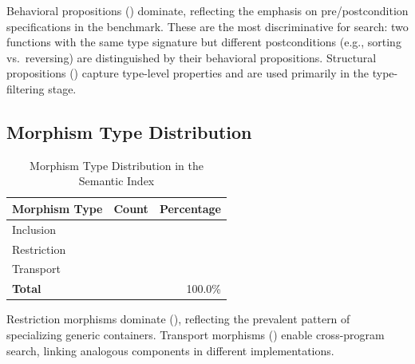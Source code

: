 \documentclass[11pt]{article}
\begin{document}
Behavioral propositions (\suppPropBehavioralPct) dominate, reflecting
the emphasis on pre/postcondition specifications in the benchmark.
These are the most discriminative for search: two functions with the
same type signature but different postconditions (e.g., sorting vs.\
reversing) are distinguished by their behavioral propositions.
Structural propositions (\suppPropStructuralPct) capture type-level
properties and are used primarily in the type-filtering stage.

\subsection{Morphism Type Distribution}

\begin{table}[H]
\centering
\caption{Morphism Type Distribution in the Semantic Index}
\label{tab:morph-dist}
\begin{tabular}{lrr}
\toprule
\textbf{Morphism Type} & \textbf{Count} & \textbf{Percentage} \\
\midrule
Inclusion   & \compMorphInclusion   & \compMorphInclusionPct \\
Restriction & \compMorphRestriction & \compMorphRestrictionPct \\
Transport   & \compMorphTransport   & \compMorphTransportPct \\
\midrule
\textbf{Total} & \compMorphTotal & 100.0\% \\
\bottomrule
\end{tabular}
\end{table}

Restriction morphisms dominate (\compMorphRestrictionPct), reflecting
the prevalent pattern of specializing generic containers.  Transport
morphisms (\compMorphTransportPct) enable cross-program search, linking
analogous components in different implementations.
\end{document}
